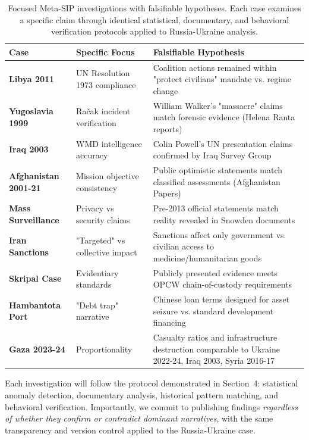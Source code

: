 \documentclass[11pt,a4paper]{article}
\begin{document}
\begin{small}
\begin{table}[ht]
\centering
\small
\begin{tabular}{@{}p{3cm}p{4cm}p{5.5cm}@{}}
\toprule
\textbf{Case} & \textbf{Specific Focus} & \textbf{Falsifiable Hypothesis} \\
\midrule
\textbf{Libya 2011} & UN Resolution 1973 compliance & Coalition actions remained within 
"protect civilians" mandate vs. regime change \\
\addlinespace
\textbf{Yugoslavia 1999} & Račak incident verification & William Walker's "massacre" 
claims match forensic evidence (Helena Ranta reports) \\
\addlinespace
\textbf{Iraq 2003} & WMD intelligence accuracy & Colin Powell's UN presentation 
claims confirmed by Iraq Survey Group \\
\addlinespace
\textbf{Afghanistan 2001-21} & Mission objective consistency & Public optimistic 
statements match classified assessments (Afghanistan Papers) \\
\addlinespace
\textbf{Mass Surveillance} & Privacy vs security claims & Pre-2013 official statements 
match reality revealed in Snowden documents \\
\addlinespace
\textbf{Iran Sanctions} & "Targeted" vs collective impact & Sanctions affect only 
government vs. civilian access to medicine/humanitarian goods \\
\addlinespace
\textbf{Skripal Case} & Evidentiary standards & Publicly presented evidence meets 
OPCW chain-of-custody requirements \\
\addlinespace
\textbf{Hambantota Port} & "Debt trap" narrative & Chinese loan terms designed 
for asset seizure vs. standard development financing \\
\addlinespace
\textbf{Gaza 2023-24} & Proportionality & Casualty ratios and infrastructure 
destruction comparable to Ukraine 2022-24, Iraq 2003, Syria 2016-17 \\
\bottomrule
\end{tabular}
\caption{Focused Meta-SIP investigations with falsifiable hypotheses. Each case 
examines a specific claim through identical statistical, documentary, and behavioral 
verification protocols applied to Russia-Ukraine analysis.}
\label{tab:metasip_pipeline}
\end{table}

Each investigation will follow the protocol demonstrated in Section~4: 
statistical anomaly detection, documentary analysis, historical pattern matching, 
and behavioral verification. Importantly, we commit to publishing findings 
\textit{regardless of whether they confirm or contradict dominant narratives}, 
with the same transparency and version control applied to the Russia-Ukraine case.


\end{small}
\end{document}
